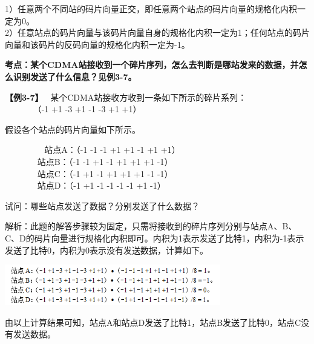 1）任意两个不同站的码片向量正交，即任意两个站点的码片向量的规格化内积一定为0。\\
2）任意站点的码片向量与该码片向量自身的规格化内积一定为1；任何站点的码片向量和该码片的反码向量的规格化内积一定为-1。

\textbf{考点：某个CDMA站接收到一个碎片序列，怎么去判断是哪站发来的数据，并怎么识别发送了什么信息？见例3-7。}

\textbf{【例3-7】} ~某个CDMA站接收方收到一条如下所示的碎片系列：\\
\hspace*{0.333em} ~ ~ ~ ~ （-1 +1 -3 +1 -1 -3 +1 +1）

假设各个站点的码片向量如下所示。

~ ~ ~ ~ ~ ~站点A：（-1 -1 -1 +1 +1 -1 +1 +1）\\
\hspace*{0.333em} ~ ~ ~ ~ ~站点B：（-1 -1 +1 -1 +1 +1 +1 -1）\\
\hspace*{0.333em} ~ ~ ~ ~ ~站点C：（-1 +1 -1 +1 +1 +1 -1 -1）\\
\hspace*{0.333em} ~ ~ ~ ~ ~站点D：（-1 +1 -1 -1 -1 -1 +1 -1）

{试问：哪些站点发送了数据？分别发送了什么数据？}

解析：此题的解答步骤较为固定，只需将接收到的碎片序列分别与站点A、B、C、D的码片向量进行规格化内积即可。内积为1表示发送了比特1，内积为-1表示发送了比特0，内积为0表示没有发送数据，计算如下。

\includegraphics[width=3.70833in,height=0.69792in]{png-jpeg-pics/254FD0619E6D9066C306AD9E400D7922.png}

{由以上计算结果可知，站点A和站点D发送了比特1，站点B发送了比特0，站点C没有发送数据。}
